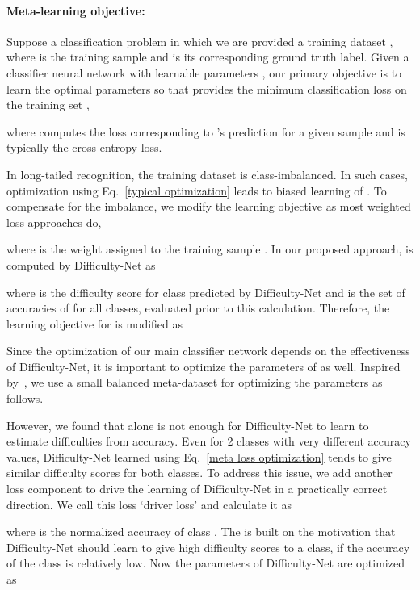 \documentclass[10pt,twocolumn,letterpaper]{article}
\begin{document}
\paragraph{Meta-learning objective:}
Suppose a classification problem in which we are provided a training dataset , where  is the  training sample and  is its corresponding ground truth label. Given a classifier neural network  with learnable parameters , our primary objective is to learn the optimal parameters  so that  provides the minimum classification loss on the training set , \ie 

where  computes the loss corresponding to 's prediction for a given sample and is typically the cross-entropy loss.

In long-tailed recognition, the training dataset  is class-imbalanced.
In such cases, optimization using Eq.~\ref{typical optimization} leads to biased learning of . To compensate for the imbalance, we modify the learning objective as most weighted loss approaches do, \ie

where  is the weight assigned to the training sample . 
In our proposed approach,  is computed by 
Difficulty-Net
 as 

where  is the difficulty score for class  predicted by Difficulty-Net and  is the set of accuracies of  for all  classes, evaluated prior to this calculation. 
Therefore, the learning objective for  is modified as 



Since the optimization of our main classifier network depends on the effectiveness of Difficulty-Net, it is important to optimize the parameters  of  as well. 
Inspired by~\cite{meta-weight-net}, we use a small balanced meta-dataset  for optimizing the parameters  as follows.



However, we found that  alone is not enough for Difficulty-Net to learn to estimate difficulties from accuracy. 
Even for 2 classes with very different accuracy values, Difficulty-Net learned using Eq.~\ref{meta loss optimization} tends to give similar difficulty scores for both classes.
To address this issue, we add another loss component to drive the learning of Difficulty-Net in a practically correct direction. We call this loss `driver loss' and calculate it as

where  is the normalized accuracy of class .
The  is built on the motivation that Difficulty-Net should learn to give high difficulty scores to a class, if the accuracy of the class is relatively low.
Now the parameters  of Difficulty-Net  are optimized as 
\end{document}
